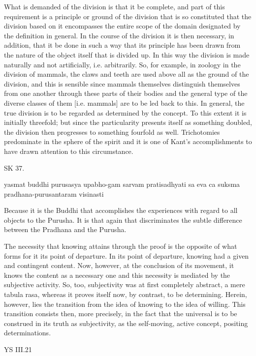     What is demanded of the division is that it be complete, and part of
    this requirement is a principle or ground of the division that is so constituted that
    the division based on it encompasses the entire scope of the domain designated
    by the definition in general.
    In the course of the division it is then necessary, in addition,
    that it be done in such a way that its principle has been drawn from
    the nature of the object itself that is divided up.
    In this way the division is made naturally and not artificially, i.e. arbitrarily.
    So, for example, in zoology in the division of mammals, the claws and teeth are used above all as the
    ground of the division, and this is sensible since mammals themselves distinguish
    themselves from one another through these parts of their bodies and the general
    type of the diverse classes of them [i.e. mammals] are to be led back to this.
    In general, the true division is to be regarded as determined by the concept.
    To this extent it is initially threefold; but since the particularity presents itself
    as something doubled, the division then progresses to something fourfold as well.
    Trichotomies predominate in the sphere of the spirit and it is one of Kant's accomplishments
    to have drawn attention to this circumstance.

SK 37.

yasmat buddhi purusasya upabho-gam sarvam pratisadhyati
sa eva ca suksma pradhana-purusantaram visinasti

Because it is the Buddhi that accomplishes the experiences
with regard to all objects to the Purusha.
It is that again that discriminates the subtle difference
between the Pradhana and the Purusha.

The necessity that knowing attains through the proof is the opposite of
what forms for it its point of departure.
In its point of departure, knowing had a given and contingent content.
Now, however, at the conclusion of its movement,
it knows the content as a necessary one and
this necessity is mediated by the subjective activity.
So, too, subjectivity was at first completely abstract, a mere tabula rasa,
whereas it proves itself now, by contrast, to be determining.
Herein, however, lies the transition
from the idea of knowing to the idea of willing.
This transition consists then, more precisely, in the fact that
the universal is to be construed in its truth as subjectivity,
as the self-moving, active concept, positing determinations.

    YS III.21

